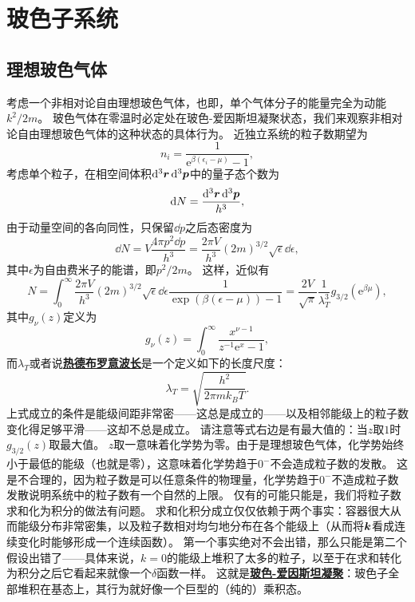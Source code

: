 \documentclass[hyperref, UTF8, a4paper]{ctexart}
\newcommand*{\ee}{\mathrm{e}}
\newcommand{\concept}[1]{\underline{\textbf{#1}}}
\begin{document}
\section{玻色子系统}

\subsection{理想玻色气体}

考虑一个非相对论自由理想玻色气体，也即，单个气体分子的能量完全为动能$k^2/2m$。
玻色气体在零温时必定处在玻色-爱因斯坦凝聚状态，我们来观察非相对论自由理想玻色气体的这种状态的具体行为。
近独立系统的粒子数期望为
\[
    n_i = \frac{1}{\ee^{\beta(\epsilon_i - \mu)} - 1},
\]
考虑单个粒子，在相空间体积$\dd[3]{\vb*{r}} \dd[3]{\vb*{p}}$中的量子态个数为
\[
    \dd{N} = \frac{\dd[3]{\vb*{r}} \dd[3]{\vb*{p}}}{h^3},
\]
由于动量空间的各向同性，只保留$\dd{p}$之后态密度为
\[
    \dd{N} = V \frac{4\pi p^2 \dd{p}}{h^3} = \frac{2\pi V}{h^3} (2m)^{3/2} \sqrt{\epsilon} \dd{\epsilon},
\]
其中$\epsilon$为自由费米子的能谱，即$p^2/2m$。
这样，近似有
\begin{equation}
    N = \int_0^\infty \frac{2\pi V}{h^3} (2m)^{3/2} \sqrt{\epsilon} \dd{\epsilon} \frac{1}{\exp(\beta (\epsilon - \mu)) - 1} = \frac{2V}{\sqrt{\pi}} \frac{1}{\lambda_T^3} g_{3/2}(\ee^{\beta \mu}),
\end{equation}
其中$g_\nu(z)$定义为
\[
    g_\nu(z) = \int_0^\infty \frac{x^{\nu-1}}{z^{-1} \ee^{x} - 1},
\]
而$\lambda_T$或者说\concept{热德布罗意波长}是一个定义如下的长度尺度：
\begin{equation}
    \lambda_T = \sqrt{\frac{h^2}{2\pi m k_B T}}.
\end{equation}
上式成立的条件是能级间距非常密——这总是成立的——以及相邻能级上的粒子数变化得足够平滑——这却不总是成立。
请注意等式右边是有最大值的：当$z$取$1$时$g_{3/2}(z)$取最大值。
$z$取一意味着化学势为零。由于是理想玻色气体，化学势始终小于最低的能级（也就是零），这意味着化学势趋于$0^-$不会造成粒子数的发散。
这是不合理的，因为粒子数是可以任意条件的物理量，化学势趋于$0^-$不造成粒子数发散说明系统中的粒子数有一个自然的上限。
仅有的可能只能是，我们将粒子数求和化为积分的做法有问题。
求和化积分成立仅仅依赖于两个事实：容器很大从而能级分布非常密集，以及粒子数相对均匀地分布在各个能级上（从而将$\vb*{k}$看成连续变化时能够形成一个连续函数）。
第一个事实绝对不会出错，那么只能是第二个假设出错了——具体来说，$k=0$的能级上堆积了太多的粒子，以至于在求和转化为积分之后它看起来就像一个$\delta$函数一样。
这就是\concept{玻色-爱因斯坦凝聚}：玻色子全部堆积在基态上，其行为就好像一个巨型的（纯的）乘积态。
\end{document}
